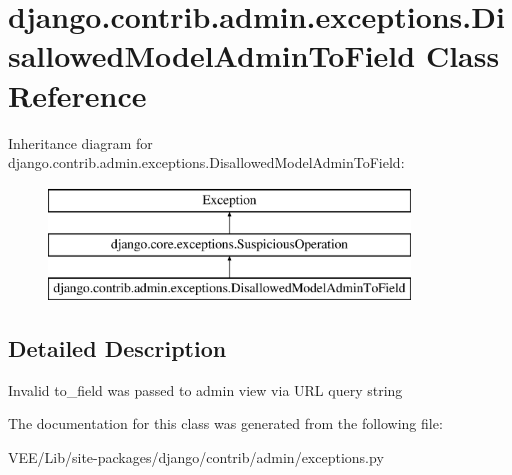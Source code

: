 \hypertarget{classdjango_1_1contrib_1_1admin_1_1exceptions_1_1_disallowed_model_admin_to_field}{}\section{django.\+contrib.\+admin.\+exceptions.\+Disallowed\+Model\+Admin\+To\+Field Class Reference}
\label{classdjango_1_1contrib_1_1admin_1_1exceptions_1_1_disallowed_model_admin_to_field}
Inheritance diagram for django.\+contrib.\+admin.\+exceptions.\+Disallowed\+Model\+Admin\+To\+Field\+:\begin{figure}[H]
\begin{center}
\leavevmode
\includegraphics[height=3.000000cm]{classdjango_1_1contrib_1_1admin_1_1exceptions_1_1_disallowed_model_admin_to_field}
\end{center}
\end{figure}


\subsection{Detailed Description}
\begin{DoxyVerb}Invalid to_field was passed to admin view via URL query string\end{DoxyVerb}
 

The documentation for this class was generated from the following file\+:\begin{DoxyCompactItemize}
\item 
V\+E\+E/\+Lib/site-\/packages/django/contrib/admin/exceptions.\+py\end{DoxyCompactItemize}
